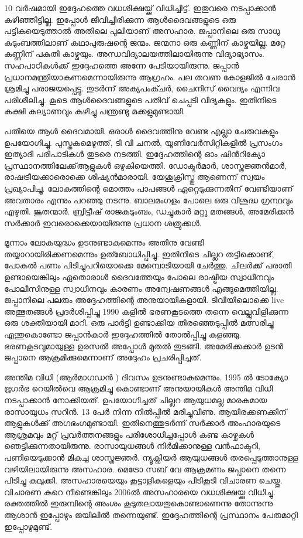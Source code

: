 \documentclass[10pt,a4paper]{report}
\begin{document}
   10 വർഷമായി ഇദ്ദേഹത്തെ വധശിക്ഷയ്ക്ക് വിധിച്ചിട്ട്. ഇതുവരെ നടപ്പാക്കാൻ കഴിഞ്ഞിട്ടില്ല. ഇപ്പോൾ ജീവിച്ചിരിക്കുന്ന ആൾദൈവങ്ങളുടെ ഒരു പട്ടികയെടുത്താൽ അതിലെ പുലിയാണ് അസഹാര. ജപ്പാനിലെ ഒരു സാധു കുടുംബത്തിലാണ് കഥാപുരുഷന്റെ ജന്മം. ജന്മനാ ഒരു കണ്ണിന് കാഴ്ചയില്ല. മറ്റേ കണ്ണിന് പകുതി കാഴ്ചയും. അന്ധവിദ്യാലയത്തിലായിരുന്നു വിദ്യാഭ്യാസം. സഹപാഠികൾക്ക് ഇദ്ദേഹത്തെ അന്നേ പേടിയായിരുന്നു. ജപ്പാൻ പ്രധാനമന്ത്രിയാകണമെന്നായിരുന്നു ആഗ്രഹം. പല തവണ കോളജിൽ ചേരാൻ ശ്രമിച്ചു പരാജയപ്പെട്ടു. തുടർന്ന് അക്യപംക്ചർ, ചൈനിസ് വൈദ്യം എന്നിവ പരിശീലിച്ചു. കൂടെ ആൾദൈവങ്ങളുടെ പതിവ് ചെപ്പടി വിദ്യകളും. ഇതിനിടെ കക്ഷി കല്യാണവും കഴിച്ചു പന്ത്രണ്ടു മക്കളുമുണ്ടായി. 
 
   പതിയെ ആൾ ദൈവമായി. ഒരാൾ ദൈവത്തിനു വേണ്ട എല്ലാ ചേരുവകളും ഉപയോഗിച്ചു. പുസ്തകമെഴുത്ത്, ടി വി ചനൽ, യൂണിവേർസിറ്റികളിൽ പ്രസംഗം ഇത്യാദി പരിപാടികൾ തുടരെ നടത്തി. ഇദ്ദേഹത്തിന്റെ ഓം ഷിൻറിക്യോ പ്രസ്ഥാനത്തിലേക്ക്‌ആളുകൾ ഒഴുകിയെത്തി. ഡോക്ടർമാർ, ശാസ്ത്രജ്ഞൻമാർ, രാഷട്രീയക്കാരൊക്കെ ശിഷ്യൻമാരായി. യേശുക്രിസ്തു ആണെന്ന് സ്വയം പ്രഖ്യാപിച്ചു. ലോകത്തിന്റെ മൊത്തം പാപങ്ങൾ ഏറ്റെടുക്കുന്നതിന് വേണ്ടിയാണ് അവതാരം എന്നും പറഞ്ഞു നടന്നു. ബാലമംഗളം പോലെ ഒരു വിശുദ്ധ ഗ്രന്ഥവും എഴുതി. ജൂതന്മാർ. ബ്രിട്ടീഷ് രാജകുടുംബം, ഡച്ചുകാർ മറ്റു മതങ്ങൾ, അമേരിക്കൻ സർക്കാർ ഇവരൊക്കെയായിരുന്നു പ്രധാന ശത്രുക്കൾ.
 
  മൂന്നാം ലോകയുദ്ധം ഉടനുണ്ടാകുമെന്നും അതിനു വേണ്ടി തയ്യാറായിരിക്കണമെന്നും ഉത്ബോധിപ്പിച്ചു. ഇതിനിടെ ചില്ലറ തട്ടിക്കൊണ്ട്, പോകൽ പണം പിടിച്ചുപറിയൊക്കെ മേമ്പൊടിയായി ചേർത്തു. ചിലർക്ക് പരാതി ഉണ്ടായെങ്കിലും ഏതൊരാൾ ദൈവത്തേയും പോലെ രാഷ്ട്രീയ സ്വാധീനവും പോലീസിനുള്ള സ്വാധീനവും കാരണം അന്വേഷണങ്ങൾ എങ്ങുമെത്തിയില്ല. ജപ്പാനിലെ പലരും അദ്ദേഹത്തിന്റെ അനുയായികളായി. ടിവിയിലൊക്കെ live അത്ഭുതങ്ങൾ പ്രദർശിപ്പിച്ചു 1990 കളിൽ ഭരണകൂടത്തെ തന്നെ വെല്ലുവിളിക്കുന്ന ഒരു ശക്തിയായി മാറി. ഒരു പാർട്ടി ഉണ്ടാക്കിയ തിരഞ്ഞെടുപ്പിൽ മത്സരിച്ചു എന്തുകൊണ്ടോ ജപ്പാൻകാർ ഇദ്ദേഹത്തിൽ തോൽപ്പിച്ചു കളഞ്ഞു. ഭരണകൂടവുമായുള്ള ഉരസൽ അപ്പോൾ മുതൽ തുടങ്ങി. അമേരിക്കക്കാർ ഉടൻ ജപ്പാനെ ആക്രമിക്കുമെന്നാണ് അദ്ദേഹം പ്രചരിപ്പിച്ചത്. 
  
  അന്തിമ വിധി (ആർമാഗഡൻ ) ദിവസം ഉടനുണ്ടാകുമെന്നും. 1995 ൽ ടോക്യോ ഭൂഗർഭ റെയിൽവെ ആക്രമിച്ചു കൊണ്ടാണ് അനുയായികൾ അന്തിമ വിധി നടപ്പാക്കാൻ നോക്കിയത്. ഉപയോഗിച്ചത് ചില്ലറ ആയുധമല്ല മാരകമായ രാസായുധം സറിൻ. 13 പേർ നിന്ന നിൽപ്പിൽ മരിച്ചുവീണു. ആയിരക്കണക്കിന് ആളുകൾക്ക് അഗഭംഗമുണ്ടായി. ഇതിനെത്തുടർന്ന് സർക്കാർ അംഹാരയുടെ ആശ്രമവും മറ്റ് പ്രവർത്തനങ്ങളും പരിശോധിച്ചപ്പോൾ കണ്ട കാഴ്ചകൾ  ഞെട്ടിക്കുന്നതായിരുന്നു. രാസായുധങ്ങൾ നിർമിക്കാനുള്ള വൻഫാക്ടറി, പണിയെടുക്കാൻ മികച്ച ശാസ്ത്രജ്ഞർ. ന്യൂക്ലിയർ ആയുധങ്ങൾ തരപ്പെടുത്താനുള്ള വഴിയിലായിരുന്നു അസഹാര. മെട്രോ സബ് വേ ആക്രമണം ജപ്പാനെ തന്നെ പിടിച്ചു കുലുക്കി. അസഹാരയെയും കൂട്ടാളികളെയും പിടികൂടി വിചാരണ ചെയ്തു. വിചാരണ കുറെ നീണ്ടെങ്കിലും 2006ൽ അസഹാരയെ വധശിക്ഷയ്ക്കു വിധിച്ചു. രക്തത്തിൽ ഇരുമ്പിന്റെ അംശം കൂടുതലായതുകൊണ്ടാണെന്നു തോന്നുന്നു ആശാൻ ഇപ്പോഴും ജയിലിൽ തന്നെയുണ്ട്. ഇദ്ദേഹത്തിന്റെ പ്രസ്ഥാനം പേരുമാറ്റി ഇപ്പോഴുമുണ്ട്. 
  
\end{document}
